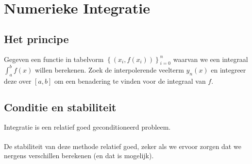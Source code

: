 \documentclass[samenvatting.tex]{subfiles}
\begin{document}
\chapter{Numerieke Integratie}
\section{Het principe}
Gegeven een functie in tabelvorm $\left\{ (x_i,f(x_i))\right\}_{i=0}^{n}$ waarvan we een integraal $\int_{a}^{b}f(x)$ willen berekenen. Zoek de interpolerende veelterm $y_n(x)$ en integreer deze over $[a,b]$ om een benadering te vinden voor de integraal van $f$.

\section{Conditie en stabiliteit}
Integratie is een relatief goed geconditioneerd probleem.\\\\
De stabiliteit van deze methode relatief goed, zeker als we ervoor zorgen dat we nergens verschillen berekenen (en dat is mogelijk).
\end{document}
